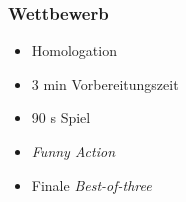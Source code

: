 \begin{frame}
	
	
	\frametitle{Wettbewerb}
	
	\begin{itemize}
		\item Homologation
	\end{itemize}
	\begin{itemize}
		\item 3 min Vorbereitungszeit
		\item 90 s Spiel
		\item \textit{Funny Action}
	\end{itemize}
	\begin{itemize}
		\item Finale \textit{Best-of-three}
	\end{itemize}
\end{frame}